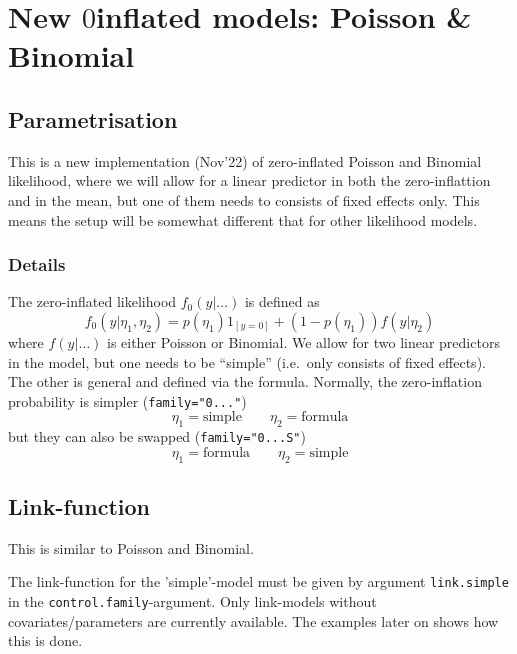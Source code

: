 \documentclass[a4paper,11pt]{article}
\begin{document}
\section*{New $0$inflated models: Poisson \& Binomial}

\subsection*{Parametrisation}

This is a new implementation (Nov'22) of zero-inflated Poisson and
Binomial likelihood, where we will allow for a linear predictor in
both the zero-inflattion and in the mean, but one of them needs to
consists of fixed effects only. This means the setup will be
somewhat different that for other likelihood models. 

\subsubsection*{Details}

The zero-inflated likelihood $f_0(y|\ldots)$ is defined as
\begin{displaymath}
    f_0(y | \eta_1, \eta_2) = p(\eta_1) 1_{[y=0]} +
    (1-p(\eta_1)) f(y | \eta_2)
\end{displaymath}
where $f(y|\ldots)$ is either Poisson or Binomial. We allow for two
linear predictors in the model, but one needs to be ``simple'' (i.e.\
only consists of fixed effects). The other is general and defined via
the formula. Normally, the zero-inflation probability is simpler (\texttt{family="0..."})
\begin{displaymath}
    \eta_1 = \text{simple} \qquad \eta_2 = \text{formula}
\end{displaymath}
but they can also be swapped (\texttt{family="0...S"})
\begin{displaymath}
    \eta_1 = \text{formula} \qquad \eta_2 = \text{simple}
\end{displaymath}

\subsection*{Link-function}

This is similar to Poisson and Binomial.

The link-function for the 'simple'-model must be given by argument
\texttt{link.simple} in the \texttt{control.family}-argument. Only
link-models without covariates/parameters are currently available. 
The examples later on shows how this is done.
\end{document}
